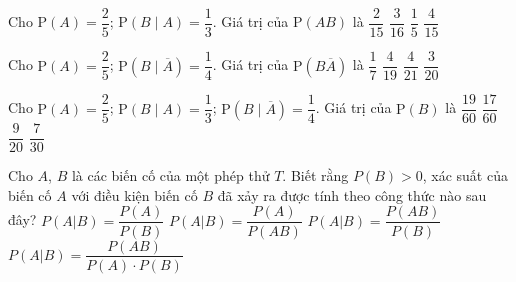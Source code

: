 \begin{ex}
	Cho $\mathrm{P}(A)=\dfrac{2}{5}$; $\mathrm{P}\left( B\mid A\right)=\dfrac{1}{3}$. Giá trị của $\mathrm{P}(AB)$ là
	\choice
	{\True $\dfrac{2}{15} $}
	{$ \dfrac{3}{16}$}
	{$ \dfrac{1}{5}$}
	{$ \dfrac{4}{15}$}
\end{ex}

\begin{ex}
	Cho $\mathrm{P}(A)=\dfrac{2}{5}$; $\mathrm{P}\left(B\mid \overline{A}\right)=\dfrac{1}{4}$. Giá trị của $\mathrm{P}\left(B\overline{A}\right)$ là
	\choice
	{$\dfrac{1}{7} $}
	{$ \dfrac{4}{19}$}
	{$ \dfrac{4}{21}$}
	{\True $ \dfrac{3}{20}$}
\end{ex}

\begin{ex}
	Cho $\mathrm{P}(A)=\dfrac{2}{5}$; $\mathrm{P}\left( B\mid A\right)=\dfrac{1}{3}$; $\mathrm{P}\left(B\mid \overline{A}\right)=\dfrac{1}{4}$. Giá trị của $\mathrm{P}(B)$ là
	\choice
	{$\dfrac{19}{60} $}
	{\True $ \dfrac{17}{60}$}
	{$ \dfrac{9}{20}$}
	{$ \dfrac{7}{30}$}
\end{ex}

\begin{ex}
	Cho $A$, $B$ là các biến cố của một phép thử $T$. Biết rằng $P(B)>0$, xác suất của biến cố $A$ với điều kiện biến cố $B$ đã xảy ra được tính theo công thức nào sau đây?
	\choice
	{$P(A|B)=\dfrac{P(A)}{P(B)}$}
	{$P(A|B)=\dfrac{P(A)}{P(A B)}$}
	{\True $P(A| B)=\dfrac{P(A B)}{P(B)}$}
	{$P(A|B)=\dfrac{P(A B)}{P(A) \cdot P(B)}$}
\end{ex}

